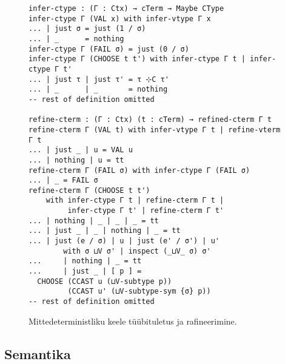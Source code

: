 \documentclass[a4paper,12pt]{article}
\begin{document}
\begin{figure}
  \begin{BVerbatim}
infer-ctype : (Γ : Ctx) → cTerm → Maybe CType
infer-ctype Γ (VAL x) with infer-vtype Γ x
... | just σ = just (1 / σ)
... | _      = nothing
infer-ctype Γ (FAIL σ) = just (0 / σ)
infer-ctype Γ (CHOOSE t t') with infer-ctype Γ t | infer-ctype Γ t'
... | just τ | just τ' = τ ⊹C τ'
... | _      | _       = nothing
-- rest of definition omitted

refine-cterm : (Γ : Ctx) (t : cTerm) → refined-cterm Γ t
refine-cterm Γ (VAL t) with infer-vtype Γ t | refine-vterm Γ t
... | just _ | u = VAL u
... | nothing | u = tt 
refine-cterm Γ (FAIL σ) with infer-ctype Γ (FAIL σ)
... | _ = FAIL σ
refine-cterm Γ (CHOOSE t t')
    with infer-ctype Γ t | refine-cterm Γ t |
         infer-ctype Γ t' | refine-cterm Γ t'
... | nothing | _ | _ | _ = tt
... | just _ | _ | nothing | _ = tt
... | just (e / σ) | u | just (e' / σ') | u'
        with σ ⊔V σ' | inspect (_⊔V_ σ) σ'
...     | nothing | _ = tt
...     | just _ | [ p ] =
  CHOOSE (CCAST u (⊔V-subtype p))
         (CCAST u' (⊔V-subtype-sym {σ} p))
-- rest of definition omitted
  \end{BVerbatim}
  \caption{Mittedeterministliku keele tüübituletus ja rafineerimine.}
  \label{fig:nd.refine}
\end{figure}


\subsection{Semantika}
\end{document}
